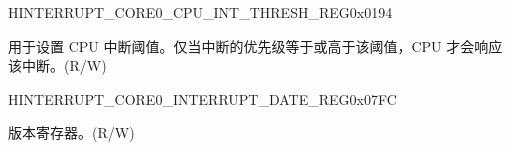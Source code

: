 \begin{register}{H}{INTERRUPT\_CORE0\_CPU\_INT\_THRESH\_REG}{0x0194}\label{regdesc:INTERRUPTCORE0CPUINTTHRESHREG}
%
%
\regnewline%
\begin{regdesc}\begin{reglist}
\label{fielddesc:INTERRUPTCORE0CPUINTTHRESH}\item [INTERRUPT\_CORE0\_CPU\_INT\_THRESH] 用于设置 CPU 中断阈值。仅当中断的优先级等于或高于该阈值，CPU 才会响应该中断。(R/W)
\end{reglist}\end{regdesc}
\end{register}


\begin{register}{H}{INTERRUPT\_CORE0\_INTERRUPT\_DATE\_REG}{0x07FC}\label{regdesc:INTERRUPTCORE0INTERRUPTDATEREG}
%
%
\regnewline%
\begin{regdesc}\begin{reglist}
\label{fielddesc:INTERRUPTCORE0INTERRUPTDATE}\item [INTERRUPT\_CORE0\_INTERRUPT\_DATE] 版本寄存器。(R/W)
\end{reglist}\end{regdesc}
\end{register}
